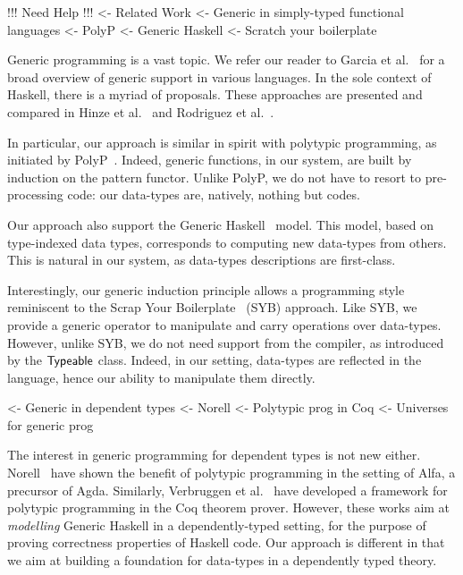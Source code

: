 \begin{wstructure}
!!! Need Help !!!
<- Related Work
    <- Generic in simply-typed functional languages
        <- PolyP \cite{jansson:polyp}
        <- Generic Haskell \cite{hinze:generic-haskell}
        <- Scratch your boilerplate \cite{spj:syb}
\end{wstructure}

Generic programming is a vast topic. We refer our reader to Garcia et
al.~\cite{garcia:generic-comparative-study} for a broad overview of
generic support in various languages. In the sole context of Haskell,
there is a myriad of proposals. These approaches are presented and
compared in Hinze et al.~\cite{hinze:generic-approach-comparative} and
Rodriguez et al.~\cite{rodriguez:generic-libs-comparative}.

In particular, our approach is similar in spirit with polytypic
programming, as initiated by PolyP~\cite{jansson:polyp}. Indeed,
generic functions, in our system, are built by induction on the
pattern functor. Unlike PolyP, we do not have to resort to
pre-processing code: our data-types are, natively, nothing but codes.

Our approach also support the Generic
Haskell~\cite{hinze:generic-haskell} model. This model, based on
type-indexed data types, corresponds to computing new data-types from
others. This is natural in our system, as data-types descriptions are
first-class.

Interestingly, our generic induction principle allows a programming
style reminiscent to the Scrap Your Boilerplate~\cite{spj:syb} (SYB)
approach. Like SYB, we provide a generic operator to manipulate and
carry operations over data-types. However, unlike SYB, we do not need
support from the compiler, as introduced by the $\textsf{Typeable}$
class. Indeed, in our setting, data-types are reflected in the
language, hence our ability to manipulate them directly.

\begin{wstructure}
    <- Generic in dependent types
        <- Norell \cite{norell:msc-thesis}
        <- Polytypic prog in Coq \cite{verbruggen:polytype-coq}
        <- Universes for generic prog \cite{benke:universe-generic-prog}
\end{wstructure}

The interest in generic programming for dependent types is not new
either. Norell~\cite{norell:msc-thesis} have shown the benefit of
polytypic programming in the setting of Alfa, a precursor of
Agda. Similarly, Verbruggen et al.~\cite{verbruggen:polytype-prog-coq,
  verbruggen:polytype-coq} have developed a framework for polytypic
programming in the Coq theorem prover. However, these works aim at
\emph{modelling} Generic Haskell in a dependently-typed setting, for
the purpose of proving correctness properties of Haskell code. Our
approach is different in that we aim at building a foundation for
data-types in a dependently typed theory.

